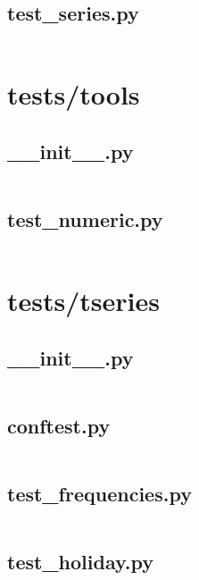 \documentclass{article}
\begin{document}
\subsection{test\_series.py}
\inputminted{python}{/home/dufferzafar/dev/@clones/pandas/pandas/tests/sparse/series/test_series.py}
\newpage

\section{tests/tools}

\subsection{\_\_init\_\_.py}
\inputminted{python}{/home/dufferzafar/dev/@clones/pandas/pandas/tests/tools/__init__.py}
\newpage

\subsection{test\_numeric.py}
\inputminted{python}{/home/dufferzafar/dev/@clones/pandas/pandas/tests/tools/test_numeric.py}
\newpage

\section{tests/tseries}

\subsection{\_\_init\_\_.py}
\inputminted{python}{/home/dufferzafar/dev/@clones/pandas/pandas/tests/tseries/__init__.py}
\newpage

\subsection{conftest.py}
\inputminted{python}{/home/dufferzafar/dev/@clones/pandas/pandas/tests/tseries/conftest.py}
\newpage

\subsection{test\_frequencies.py}
\inputminted{python}{/home/dufferzafar/dev/@clones/pandas/pandas/tests/tseries/test_frequencies.py}
\newpage

\subsection{test\_holiday.py}
\inputminted{python}{/home/dufferzafar/dev/@clones/pandas/pandas/tests/tseries/test_holiday.py}
\newpage
\end{document}
